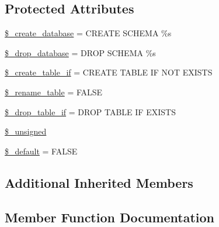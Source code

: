 \subsection*{Protected Attributes}
\begin{DoxyCompactItemize}
\item 
\mbox{\hyperlink{class_c_i___d_b__pdo__4d__forge_acd23c9a8735806155f1a5d0a87c151f2}{\$\+\_\+create\+\_\+database}} = \textquotesingle{}C\+R\+E\+A\+TE S\+C\+H\+E\+MA \%s\textquotesingle{}
\item 
\mbox{\hyperlink{class_c_i___d_b__pdo__4d__forge_a8305b12fc17f6f87778260ebdff287b4}{\$\+\_\+drop\+\_\+database}} = \textquotesingle{}D\+R\+OP S\+C\+H\+E\+MA \%s\textquotesingle{}
\item 
\mbox{\hyperlink{class_c_i___d_b__pdo__4d__forge_a2f6484fcb8d1dc3eef67a637227cd583}{\$\+\_\+create\+\_\+table\+\_\+if}} = \textquotesingle{}C\+R\+E\+A\+TE T\+A\+B\+LE IF N\+OT E\+X\+I\+S\+TS\textquotesingle{}
\item 
\mbox{\hyperlink{class_c_i___d_b__pdo__4d__forge_a1a649e7cf9de16bcf932977b18bc91de}{\$\+\_\+rename\+\_\+table}} = F\+A\+L\+SE
\item 
\mbox{\hyperlink{class_c_i___d_b__pdo__4d__forge_a92a8a9145a7fc91e252e58d019373581}{\$\+\_\+drop\+\_\+table\+\_\+if}} = \textquotesingle{}D\+R\+OP T\+A\+B\+LE IF E\+X\+I\+S\+TS\textquotesingle{}
\item 
\mbox{\hyperlink{class_c_i___d_b__pdo__4d__forge_aae977ae6d61fa183f0b25422b6ddc31c}{\$\+\_\+unsigned}}
\item 
\mbox{\hyperlink{class_c_i___d_b__pdo__4d__forge_aa119e1b4e3d00f47a7b83b7066087915}{\$\+\_\+default}} = F\+A\+L\+SE
\end{DoxyCompactItemize}
\subsection*{Additional Inherited Members}


\subsection{Member Function Documentation}
\mbox{\label{class_c_i___d_b__pdo__4d__forge_a41c6cae02f2fda8b429ad0afb9509426}} 

